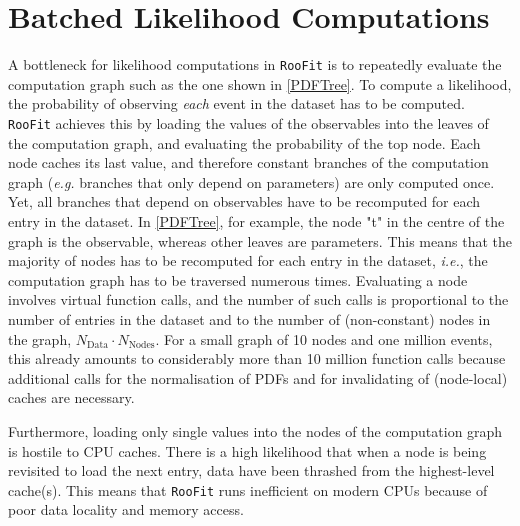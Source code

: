 \documentclass[a4paper]{jpconf}
\newcommand{\RooFit}{\texttt{RooFit}\xspace}
\newcommand{\ie}{\textit{i.e.}\xspace}
\begin{document}
\section{Batched Likelihood Computations}
A bottleneck for likelihood computations in \RooFit is to repeatedly evaluate the computation graph such as the one 
shown in \cref{PDFTree}. To compute a likelihood, the probability of observing \textit{each} event in the dataset has to be computed.
\RooFit achieves this by loading the values of the observables into the leaves of the computation graph, and evaluating the probability of
the top node. Each node caches its last value, and therefore constant branches of the computation graph (\textit{e.g.} branches that only 
depend on parameters) are only computed once.
Yet, all branches that depend on observables have to be recomputed for each entry in the dataset. In \cref{PDFTree}, for example, the node
"t" in the centre of the graph is the observable, whereas other leaves are parameters. This means that the majority of nodes has to be
recomputed for each entry in the dataset, \ie, the computation graph has to be traversed numerous times. Evaluating a node involves virtual
function calls, and the number of such calls is proportional to the number of entries in the dataset and
to the number of (non-constant) nodes in the graph, $N_\mathrm{Data} \cdot N_\mathrm{Nodes}$. For a small graph of 10 nodes and one million
events, this already amounts to considerably more than 10 million function calls because additional calls for the normalisation of PDFs and
for invalidating of (node-local) caches are necessary.

Furthermore, loading only single values into the nodes of the computation graph is hostile to CPU caches. There is a high likelihood that
when a node is being revisited to load the next entry, data have been thrashed from the highest-level cache(s). This means that \RooFit runs inefficient on
modern CPUs because of poor data locality and memory access.
\end{document}
